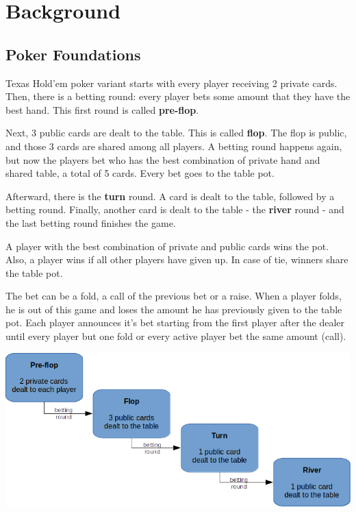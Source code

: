 \newpage

\chapter{Background}
\label{chap:background}

\section{Poker Foundations}
\label{sec:foundations}

Texas Hold'em poker variant starts with every player receiving 2 private cards. Then, there is a betting round: every player bets some amount that they have the best hand. This first round is called \textbf{pre-flop}.

Next, 3 public cards are dealt to the table. This is called \textbf{flop}. The flop is public, and those 3 cards are shared among all players. A betting round happens again, but now the players bet who has the best combination of private hand and shared table, a total of 5 cards. Every bet goes to the table pot.

Afterward, there is the \textbf{turn} round. A card is dealt to the table, followed by a betting round. Finally, another card is dealt to the table - the \textbf{river} round - and the last betting round finishes the game.

A player with the best combination of private and public cards wins the pot. Also, a player wins if all other players have given up. In case of tie, winners share the table pot.
 
The bet can be a fold, a call of the previous bet or a raise. When a player folds, he is out of this game and loses the amount he has previously given to the table pot. Each player announces it's bet starting from the first player after the dealer until every player but one fold or every active player bet the same amount (call). 

\vspace{2cm}
\includegraphics[scale=2]{poker-foundations}
\vspace{0.5cm}

